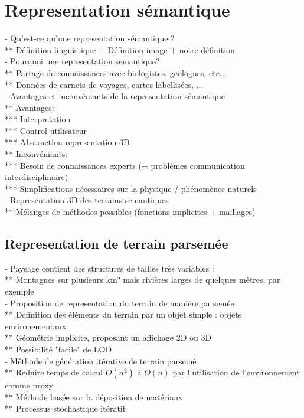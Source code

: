 \chapter{Representation sémantique}
\minitoc

- Qu'est-ce qu'une representation sémantique ? \\
** Définition linguistique + Définition image + notre définition \\
- Pourquoi une representation semantique? \\
** Partage de connaissances avec biologistes, geologues, etc... \\
** Données de carnets de voyages, cartes labellisées, ... \\
- Avantages et inconvéniants de la representation sémantique \\
** Avantages: \\
*** Interpretation \\
*** Control utilisateur \\
*** Abstraction representation 3D \\
** Inconvéniants: \\
*** Besoin de connaissances experts (+ problèmes communication interdisciplinaire) \\
*** Simplifications nécessaires sur la physique / phénomènes naturels \\
- Representation 3D des terrains semantiques \\
** Mélanges de méthodes possibles (fonctions implicites + maillages)

\section{Representation de terrain parsemée}
- Paysage contient des structures de tailles très variables :\\
** Montagnes sur plusieurs km² mais rivières larges de quelques mètres, par exemple \\
- Proposition de representation du terrain de manière parsemée \\
** Definition des éléments du terrain par un objet simple : objets environementaux \\
** Géométrie implicite, proposant un affichage 2D ou 3D \\
** Possibilité "facile" de LOD \\
- Méthode de génération itérative de terrain parsemé \\
** Reduire temps de calcul $O(n^2)$ à $O(n)$ par l'utilisation de l'environnement comme proxy\\
** Méthode basée sur la déposition de matériaux \\
** Processus stochastique itératif

